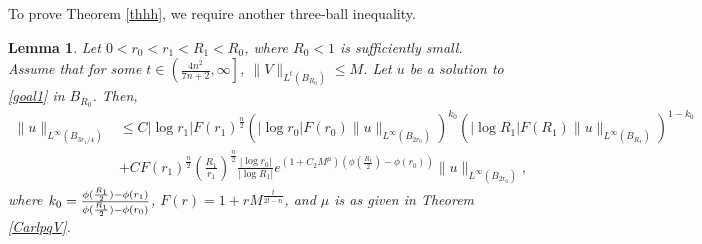 \documentclass[11pt]{amsart}
\theoremstyle{plain}
\newtheorem{lemma}{Lemma}
\numberwithin{equation}{section}
\begin{document}
To prove Theorem \ref{thhh}, we require another three-ball inequality.

\begin{lemma}
Let $0 < r_0< r_1< R_1 < R_0$, where $R_0 < 1$ is sufficiently small.
Assume that for some $t \in {\left( { \frac{4n^2}{7n+2}, {\infty}} \right] }$, $\|V\|_{L^t{\left( {B_{R_0}} \right) }} \le M$.
Let $u$ be a solution to \eqref{goal1} in $B_{R_0}$.
Then,
\begin{align}
\|u\|_{L^\infty {\left( {B_{3r_1/4}} \right) }}
&\le C |\log r_1| F{\left( {r_1} \right) }^{\frac n 2} {\left( {|\log r_0| F{\left( {r_0} \right) } \|u\|_{L^{\infty}(B_{2r_0})}} \right) }^{k_0} {\left( { |\log R_1|F{\left( {R_1} \right) } \|u\|_{L^{\infty}(B_{R_1})}} \right) }^{1 - k_0} \nonumber  \\
&+C F{\left( {r_1} \right) }^{\frac n 2}  {\left( {\frac{R_1}{r_1}} \right) }^{\frac n
2}\frac{{\left\vert{\log r_0}\right\vert}}{{\left\vert{\log R_1}\right\vert}} e^{{\left( {1 + C_2 M^\mu} \right) }
{\left( {\phi{\left( {\frac{R_1}{2}} \right) }-\phi(r_0)} \right) }} \|u\|_{L^{\infty}(B_{2r_0})},
\label{three2}
\end{align}
where ${\displaystyle} k_0 =
\frac{\phi(\frac{R_1}{2})-\phi(r_1)}{\phi(\frac{R_1}{2})-\phi(r_0)}$,
$F{\left( {r} \right) } = 1 + r M^{\frac{t}{2t-n}}$, and $\mu$ is as given in
Theorem \ref{CarlpqV}.
\end{lemma}
\end{document}
